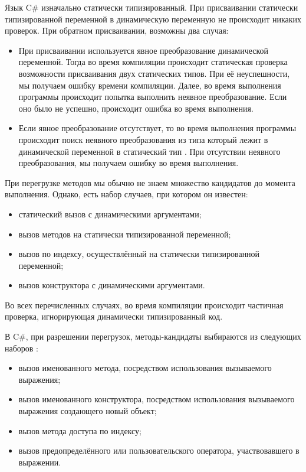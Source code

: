 Язык C\# изначально статически типизированный. При присваивании статически типизированной переменной в динамическую переменную не происходит никаких проверок. При обратном присваивании, возможны два случая:
\begin{itemize}
    \item При присваивании используется  явное преобразование динамической переменной. Тогда во время компиляции происходит статическая проверка возможности присваивания двух статических типов. При её неуспешности, мы получаем ошибку времени компиляции. Далее, во время выполнения программы происходит попытка выполнить неявное преобразование. Если оно было не успешно, происходит ошибка во время выполнения. 
    \item Если явное преобразование отсутствует, то во время выполнения программы происходит поиск неявного преобразования из типа который лежит в динамической переменной в статический тип \cite{csharp:languageSpecification}. При отсутствии неявного преобразования, мы получаем ошибку во время выполнения. 
\end{itemize}



При перегрузке методов мы обычно не знаем множество кандидатов до момента выполнения. Однако, есть набор случаев, при котором он известен:
\begin{itemize}
    \item статический вызов с динамическими аргументами;
    \item вызов методов на статически типизированной переменной;
    \item вызов по индексу, осуществлённый на статически типизированной переменной;
    \item вызов конструктора с динамическими аргументами.
\end{itemize}
Во всех перечисленных случаях, во время компиляции происходит частичная проверка, игнорирующая динамически типизированный код. 

В C{\#}, при разрешении перегрузок, методы-кандидаты выбираются из следующих наборов \cite{csharp:languageSpecification}:

\begin{itemize}
    \item вызов именованного метода, посредством использования вызываемого выражения;
    \item вызов именованного конструктора, посредством использования вызываемого выражения создающего новый объект;
    \item вызов метода доступа по индексу;
    \item вызов предопределённого или пользовательского оператора, участвовавшего в выражении.
\end{itemize}


